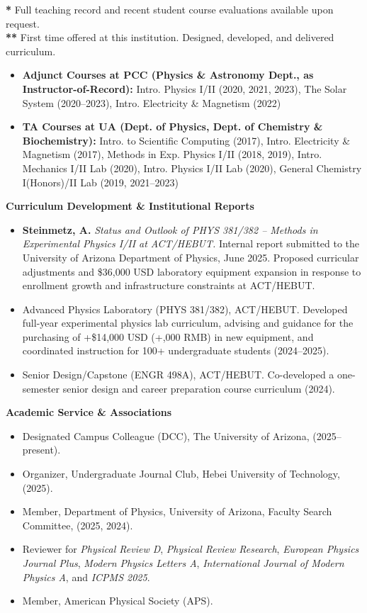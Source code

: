 \documentclass[11pt]{article}
\begin{document}
\textbf{*} Full teaching record and recent student course evaluations available upon request.\\[0.0em]
\textbf{**} First time offered at this institution. Designed, developed, and delivered curriculum.

\begin{itemize}[leftmargin=*,nosep]
    \item \textbf{Adjunct Courses at PCC (Physics \& Astronomy Dept., as Instructor-of-Record):} Intro. Physics I/II (2020, 2021, 2023), The Solar System (2020--2023), Intro. Electricity \& Magnetism (2022)
    \item \textbf{TA Courses at UA (Dept. of Physics, Dept. of Chemistry \& Biochemistry):} Intro. to Scientific Computing (2017), Intro. Electricity \& Magnetism (2017), Methods in Exp. Physics I/II (2018, 2019), Intro. Mechanics I/II Lab (2020), Intro. Physics I/II Lab (2020), General Chemistry I(Honors)/II Lab (2019, 2021--2023)
\end{itemize}

\medskip

{\Large\textbf{Curriculum Development \& Institutional Reports}}
\begin{itemize}[leftmargin=*,nosep]
    \item \textbf{Steinmetz, A.} \textit{Status and Outlook of PHYS 381/382 -- Methods in Experimental Physics I/II at ACT/HEBUT.} Internal report submitted to the University of Arizona Department of Physics, June 2025. Proposed curricular adjustments and \$36,000 USD laboratory equipment expansion in response to enrollment growth and infrastructure constraints at ACT/HEBUT.
    \item Advanced Physics Laboratory (PHYS 381/382), ACT/HEBUT. Developed full-year experimental physics lab curriculum, advising and guidance for the purchasing of +\$14,000 USD (+,000 RMB) in new equipment, and coordinated instruction for 100+ undergraduate students (2024--2025).
    \item Senior Design/Capstone (ENGR 498A), ACT/HEBUT. Co-developed a one-semester senior design and career preparation course curriculum (2024).
\end{itemize}

\medskip

{\Large\textbf{Academic Service \& Associations}}

\begin{itemize}[leftmargin=*,nosep]
    \item Designated Campus Colleague (DCC), The University of Arizona, (2025--present).
    \item Organizer, Undergraduate Journal Club, Hebei University of Technology, (2025).
    \item Member, Department of Physics, University of Arizona, Faculty Search Committee, (2025, 2024).
    \item Reviewer for \textit{Physical Review D}, \textit{Physical Review Research}, \textit{European Physics Journal Plus}, \textit{Modern Physics Letters A}, \textit{International Journal of Modern Physics A}, and \textit{ICPMS 2025}.
    \item Member, American Physical Society (APS).
\end{itemize}
\end{document}
